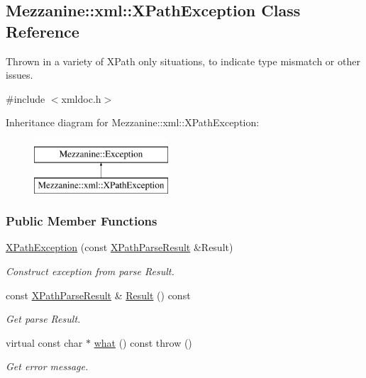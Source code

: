\hypertarget{classMezzanine_1_1xml_1_1XPathException}{
\subsection{Mezzanine::xml::XPathException Class Reference}
\label{classMezzanine_1_1xml_1_1XPathException}
}


Thrown in a variety of XPath only situations, to indicate type mismatch or other issues.  




{\ttfamily \#include $<$xmldoc.h$>$}

Inheritance diagram for Mezzanine::xml::XPathException:\begin{figure}[H]
\begin{center}
\leavevmode
\includegraphics[height=2.000000cm]{classMezzanine_1_1xml_1_1XPathException}
\end{center}
\end{figure}
\subsubsection*{Public Member Functions}
\begin{DoxyCompactItemize}
\item 
\hypertarget{classMezzanine_1_1xml_1_1XPathException_ad5c3cee13f545675852fd7cc61f585ec}{
\hyperlink{classMezzanine_1_1xml_1_1XPathException_ad5c3cee13f545675852fd7cc61f585ec}{XPathException} (const \hyperlink{structMezzanine_1_1xml_1_1XPathParseResult}{XPathParseResult} \&Result)}
\label{classMezzanine_1_1xml_1_1XPathException_ad5c3cee13f545675852fd7cc61f585ec}

\begin{DoxyCompactList}\small\item\em Construct exception from parse Result. \item\end{DoxyCompactList}\item 
const \hyperlink{structMezzanine_1_1xml_1_1XPathParseResult}{XPathParseResult} \& \hyperlink{classMezzanine_1_1xml_1_1XPathException_a1660f5681f58486216b0626e551cb65c}{Result} () const 
\begin{DoxyCompactList}\small\item\em Get parse Result. \item\end{DoxyCompactList}\item 
virtual const char $\ast$ \hyperlink{classMezzanine_1_1xml_1_1XPathException_a040315fc2032b730ac341debb24aa882}{what} () const   throw ()
\begin{DoxyCompactList}\small\item\em Get error message. \item\end{DoxyCompactList}\end{DoxyCompactItemize}



